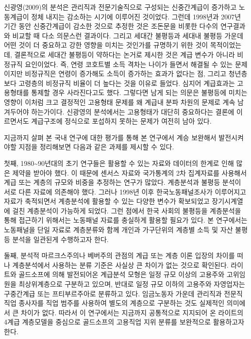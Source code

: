 \documentclass[
  letterpaper,
  DIV=11,
  numbers=noendperiod]{scrartcl}
\begin{document}
신광영(2009)의 분석은 관리직과 전문기술직으로 구성되는 신중간계급이
증가하고 노동계급이 정체 내지는 감소하는 시기에 이루어진 것이었다.
그런데 1998년과 2007년 기간 동안 신중간계급이 감소한 것으로 추정한 것은
조돈문을 비롯한 다수의 연구결과와 비교할 때 다소 의문스런 결과이다.
그리고 세대간 불평등과 세대내 불평등 가운데 어떤 것이 더 중요하고 강한
영향을 미치는 것인가를 규명하기 위한 것이 목적이었는데, 결론적으로
세대간 불평등이 약하다는 논거로 제시한 것은 계급 변수가 아니라 비정규직
요인이었다. 즉, 연령 코호트별 소득 격차는 나이가 들면서 해결될 수 있는
문제이지만 비정규직은 연령이 증가해도 소득이 증가하는 효과가 없다는 점,
그리고 청년층보다 고령층의 비정규직 비율이 더 높다는 것을 이유로 들었다.
심지어 계급효과는 고용형태를 통제할 경우 사라진다고도 했다. 그렇다면
남게 되는 의문은 불평등에 미치는 영향이 이처럼 크고 결정적인 고용형태
문제를 왜 계급내 분파 차원의 문제로 계속 남겨두어야 하는가이다. 신광영의
분석에서는 고용형태가 대단히 중요하다는 결론에 이르면서도 계급구조에
정식으로 포섭하지 못하는 문제가 여전히 남아 있다.

지금까지 살펴 본 국내 연구에 대한 평가를 통해 본 연구에서 계승 보완해서
발전시켜야할 지점을 정리해보면 다음과 같은 과제를 제시할 수 있다.

첫째, 1980\textasciitilde90년대의 초기 연구들은 활용할 수 있는 자료와
데이터의 한계로 인해 많은 제약을 받아야 했다. 이 때문에 센서스 자료와
국가통계의 2차 집계자료를 사용해서 계급 또는 계층의 규모와 비중을
추정하는 연구가 많았다. 계층분석과 불평등 분석이 서로 다른 자료에
의존해야 했다. 그러나 1998년 이후 한국노동패널조사가 이루어지고 자료가
축적되면서 계층분석에 활용할 수 있는 다양한 변수가 확보되었고
장기시계열에 걸친 계층분석이 가능하게 되었다. 그런 점에서 한국 사회의
불평등을 계층분석을 통해 접근하기 위해서는 노동패널 자료를 충실하게
활용할 필요가 있다. 본 연구에서는 노동패널을 단일 자료로 계층분류와 함께
개인과 가구단위의 계층별 소득 및 자산 불평등 분석을 일관된게 수행하고자
한다.

둘째, 분석적 마르크스주의나 베버주의 관점의 계급 또는 계층 이론 입장의
차이를 떠나 계층분석에서 사용하는 분류 기준은 사실상 큰 차이가 없는
것으로 확인된다. 라이트와 골드소프에 의해 발전되어온 계급분석 모형은
일정 규모 이상의 고용주와 고위임원을 최상위계층으로 구분하고 있으며,
반대로 일정 규모 이하의 고용주와 자영업자는 구중간계급 또는
프티부르주아로 분류하고 있다. 임금노동자 가운데 관리직과 전문직 직업
종사자를 직업 범주를 사용하여 별도의 계층으로 구분하는 것도 실제적인
의미에서 큰 차이가 없다. 따라서 이 연구에서는 지금까지 공통적으로
지지되어 온 라이트의 4계급 계층모델을 중심으로 골드소프의 고용직업 지위
분류를 보완적으로 활용하고자 한다.
\end{document}
